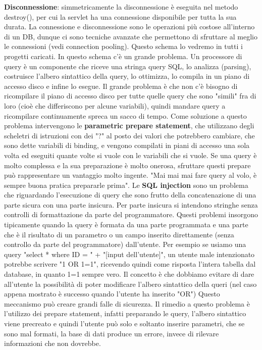 \textbf{Disconnessione}: simmetricamente la disconnessione è eseguita nel metodo destroy(), per cui la servlet ha una connessione disponibile per tutta la sua durata.\newline
\newline
La connessione e disconnessione sono le operazioni più costose all'interno di un DB, dunque ci sono tecniche avanzate che permettono di sfruttare al meglio le connessioni (vedi connection pooling).\newline
\newline
Questo schema lo vedremo in tutti i progetti caricati.\newline
\newline
In questo schema c'è un grande problema. Un processore di query è un componente che riceve una stringa query SQL, lo analizza (parsing), costruisce l'albero sintattico della query, lo ottimizza, lo compila in un piano di accesso disco e infine lo esegue. Il grande problema è che non c'è bisogno di ricompilare il piano di accesso disco per tutte quelle query che sono "simili" fra di loro (cioè che differiscono per alcune variabili), quindi mandare query a ricompilare continuamente spreca un sacco di tempo. Come soluzione a questo problema intervengono le \textbf{parametric prepare statement}, che utilizzano degli scheletri di istruzioni con dei "?" al posto dei valori che potrebbero cambiare, che sono dette variabili di binding, e vengono compilati in piani di accesso una sola volta ed eseguiti quante volte si vuole con le variabili che si vuole. Se una query è molto complessa e la sua preparazione è molto onerosa, sfruttare questi prepare può rappresentare un vantaggio molto ingente.\newline
"Mai mai mai fare query al volo, è sempre buona pratica prepararle prima".\newline
\newline
Le \textbf{SQL injection} sono un problema che riguardando l'esecuzione di query che sono frutto della concatenazione di una parte sicura con una parte insicura.\newline
Per parte insicura si intendono stringhe senza controlli di formattazione da parte del programmatore. Questi problemi insorgono tipicamente quando la query è formata da una parte programmata e una parte che è il risultato di un parametro o un campo inserito direttamente (senza controllo da parte del programmatore) dall'utente. Per esempio se usiamo una query "select * where ID = " + "[input dell'utente]", un utente male intenzionato potrebbe scrivere "1 OR 1=1", ricevendo quindi come risposta l'intera tabella dal database, in quanto 1=1  sempre vero. Il concetto è che dobbiamo evitare di dare all'utente la possibilità di poter modificare l'albero sintattico della queri (nel caso appena mostrato è successo quando l'utente ha inserito "OR") Questo meccanismo può creare grandi falle di sicurezza.\newline
Il rimedio a questo problema è l'utilizzo dei prepare statement, infatti preparando le query, l'albero sintattico viene precreato e quindi l'utente può solo e soltanto inserire parametri, che se sono mal formati, la base di dati produce un errore, invece di rilevare informazioni che non dovrebbe.\newline
\newline
